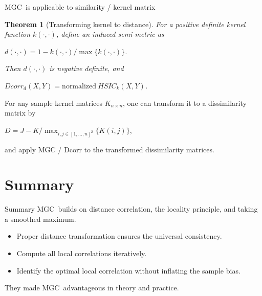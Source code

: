 \documentclass[mathserif,t]{beamer}
\newtheorem{thm}{Theorem}
\newcommand{\Mgc}{MGC}
\begin{document}
\begin{frame}{\Mgc~is applicable to similarity / kernel matrix}
\begin{thm}[Transforming kernel to distance]
For a positive definite kernel function $k(\cdot,\cdot)$, define an induced semi-metric as 
\begin{center}
$d(\cdot,\cdot)=1-k(\cdot,\cdot) / \max\{k(\cdot,\cdot)\}$.
\end{center}
Then $d(\cdot,\cdot)$ is negative definite, and 
\begin{center}
$Dcorr_{d}(X,Y)=\mbox{normalized} \ HSIC_{k}(X,Y)$.
\end{center}
\end{thm}
\pause
\medskip
For any sample kernel matrices $K_{n \times n}$, one can transform it to a dissimilarity matrix by 
\begin{center}
$D=J-K/\max_{i,j \in [1,\ldots,n]^2}\{K(i,j)\}$,
\end{center}
and apply MGC / Dcorr to the transformed dissimilarity matrices.
\end{frame}

\section{Summary}
\begin{frame}{Summary}
\pause
\Mgc~builds on distance correlation, the locality principle, and taking a smoothed maximum.

\pause
\medskip
\begin{itemize}[<+->]
\item Proper distance transformation ensures the universal consistency.
\item Compute all local correlations iteratively.
\item Identify the optimal local correlation without inflating the sample bias.
\end{itemize}
\pause
\medskip
They made \Mgc~advantageous in theory and practice.\\
\end{frame}
\end{document}
